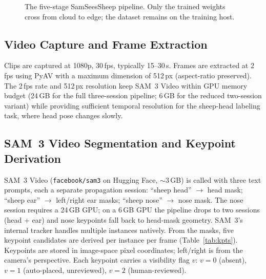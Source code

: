 \documentclass[11pt]{article}
\begin{document}
\begin{figure}[t]
  \centering
  \caption{The five-stage SamSeesSheep pipeline. Only the trained weights cross
  from cloud to edge; the dataset remains on the training host.}
  \label{fig:pipeline}
\end{figure}

\subsection{Video Capture and Frame Extraction}
Clips are captured at 1080p, 30\,fps, typically 15--30\,s. Frames are extracted
at 2\,fps using PyAV with a maximum dimension of 512\,px (aspect-ratio
preserved). The 2\,fps rate and 512\,px resolution keep SAM~3 Video within GPU
memory budget (24\,GB for the full three-session pipeline; 6\,GB for the reduced
two-session variant) while providing sufficient temporal resolution for the
sheep-head labeling task, where head pose changes slowly.

\subsection{SAM~3 Video Segmentation and Keypoint Derivation}
SAM~3 Video (\texttt{facebook/sam3} on Hugging Face, ${\sim}3$\,GB) is called
with three text prompts, each a separate propagation session: ``sheep head''
$\rightarrow$ head mask; ``sheep ear'' $\rightarrow$ left/right ear masks;
``sheep nose'' $\rightarrow$ nose mask. The nose session requires a 24\,GB GPU;
on a 6\,GB GPU the pipeline drops to two sessions (head + ear) and nose
keypoints fall back to head-mask geometry. SAM~3's internal tracker handles
multiple instances natively. From the masks, five keypoint candidates are
derived per instance per frame (Table~\ref{tab:kpts}). Keypoints are stored in
image-space pixel coordinates; left/right is from the camera's perspective. Each
keypoint carries a visibility flag $v$: $v{=}0$ (absent), $v{=}1$ (auto-placed,
unreviewed), $v{=}2$ (human-reviewed).
\end{document}
